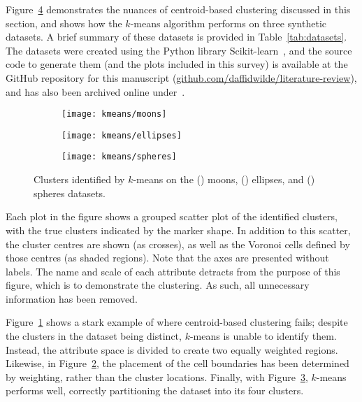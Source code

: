 Figure~\ref{fig:kmeans_examples} demonstrates the nuances of centroid-based
clustering discussed in this section, and shows how the \(k\)-means algorithm
performs on three synthetic datasets. A brief summary of these datasets is
provided in Table~\ref{tab:datasets}. The datasets were created using the Python
library Scikit-learn~\cite{scikit-learn}, and the source code to generate them
(and the plots included in this survey) is available at the GitHub repository
for this manuscript (\url{github.com/daffidwilde/literature-review}), and has
also been archived online under~.

\begin{figure}
    \centering
    \begin{subfigure}{.333\textwidth}
        \texttt{[image: kmeans/moons]}
        \caption{}\label{fig:kmeans_moons}
    \end{subfigure}%
    \hfill%
    \begin{subfigure}{.333\textwidth}
        \texttt{[image: kmeans/ellipses]}
        \caption{}\label{fig:kmeans_ellipses}
    \end{subfigure}%
    \hfill%
    \begin{subfigure}{.333\textwidth}
        \texttt{[image: kmeans/spheres]}
        \caption{}\label{fig:kmeans_spheres}
    \end{subfigure}
    \caption{%
        Clusters identified by \(k\)-means on the ()
        moons, () ellipses, and
        () spheres datasets.%
    }\label{fig:kmeans_examples}
\end{figure}

Each plot in the figure shows a grouped scatter plot of the identified clusters,
with the true clusters indicated by the marker shape. In addition to this
scatter, the cluster centres are shown (as crosses), as well as the Voronoi
cells defined by those centres (as shaded regions). Note that the axes are
presented without labels. The name and scale of each attribute detracts from the
purpose of this figure, which is to demonstrate the clustering. As such, all
unnecessary information has been removed.

Figure~\ref{fig:kmeans_moons} shows a stark example of where centroid-based
clustering fails; despite the clusters in the dataset being distinct,
\(k\)-means is unable to identify them. Instead, the attribute space is divided
to create two equally weighted regions. Likewise, in
Figure~\ref{fig:kmeans_ellipses}, the placement of the cell boundaries has been
determined by weighting, rather than the cluster locations. Finally, with
Figure~\ref{fig:kmeans_spheres}, \(k\)-means performs well, correctly
partitioning the dataset into its four clusters.

